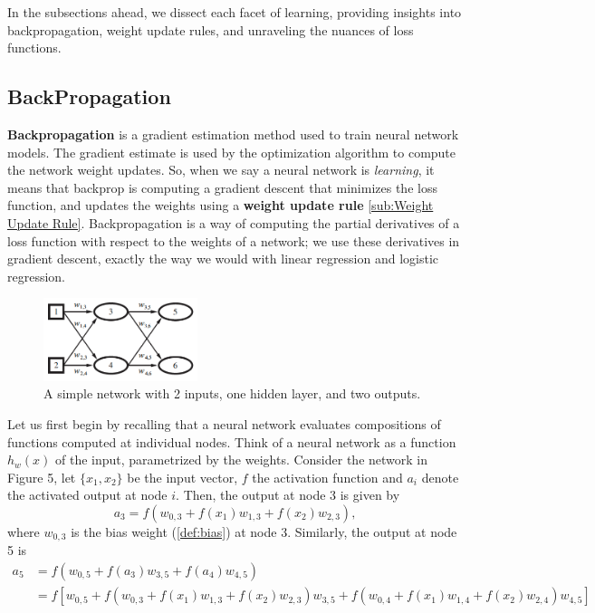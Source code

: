 \documentclass{article}
\begin{document}
In the subsections ahead, we dissect each facet of learning, providing insights into backpropagation, weight update rules, and unraveling the nuances of loss functions.\subsection{BackPropagation}%
  \label{sub:BackPropagation}
\textbf{Backpropagation} is a gradient estimation method used to train neural network models. The gradient estimate is used by the optimization algorithm to compute the network weight updates. So, when we say a neural network is \textit{learning}, it means that backprop is computing a gradient descent that minimizes the loss function, and updates the weights using a \textbf{weight update rule} \ref{sub:Weight Update Rule}. Backpropagation is a way of computing the partial derivatives of a loss function with respect to the weights of a network; we use these derivatives in gradient descent, exactly the way we would with linear regression and logistic regression. 
\begin{figure} %
    \centering
    \label{simpleNet}
    \includegraphics[width=0.4\textwidth]{simpleNet}
    \caption{A simple network with 2 inputs, one hidden layer, and two outputs.}
\end{figure}
  Let us first begin by recalling that a neural network evaluates compositions of functions computed at individual nodes. Think of a neural network as a function $h_w(x)$ of the input, parametrized by the weights. Consider the network in Figure 5, let $\{x_1,x_2\}$ be the input vector, $f$ the activation function and $a_i$ denote the activated output at node $i$. Then, the output at node 3 is given by
  $$a_3 = f(w_{0, 3} + f(x_1)w_{1,3} + f(x_2)w_{2,3}), $$
  where $w_{0,3}$ is the bias weight (\autoref{def:bias}) at node 3. Similarly, the output at node 5 is
  \begin{equation*}
    \begin{split}
      a_5 &= f( w_{0,5} + f(a_3) w_{3,5} + f(a_4) w_{4,5}  )\\ 
      &= f[w_{0,5} + f(w_{0, 3} + f(x_1)w_{1,3} + f(x_2)w_{2,3})w_{3,5} +f(w_{0, 4} + f(x_1)w_{1,4} + f(x_2)w_{2,4})w_{4,5} ]
    \end{split}
  \end{equation*}
\end{document}
